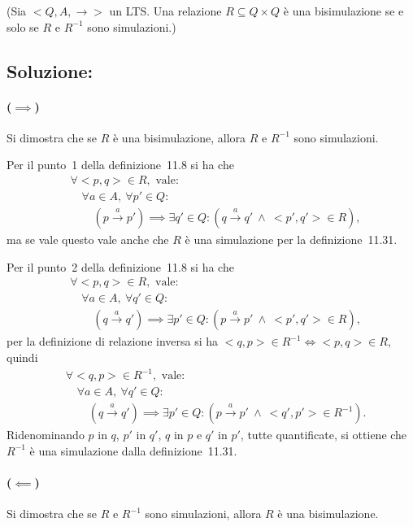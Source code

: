\documentclass[a4paper,twosides]{report}
\begin{document}
{\tiny
(Sia $<Q, A, \rightarrow >$ un LTS. Una relazione $R \subseteq Q \times Q$ è una bisimulazione se e solo se $R$ e $R^{-1}$
sono simulazioni.)
}
\subsection*{Soluzione:}
\paragraph{($\implies$)} Si dimostra che se $R$ \`e una
bisimulazione, allora $R$ e $R^{-1}$ sono simulazioni.

Per il punto~1 della
definizione~11.8 si ha che 
\begin{align*}
&\forall <p,q>\in R,\text{ vale:}\\
&\quad\forall a\in A,\ \forall p'\in Q:\\
&\quad\quad(p\xrightarrow{a} p')\implies\exists q'\in Q:(q\xrightarrow{a} q'\
\land\ <p',q'>\in R),
\end{align*}
ma se vale questo vale anche che $R$ \`e
una simulazione per la definizione~11.31.

Per il punto~2 della definizione~11.8 si ha che
\begin{align*}
&\forall <p,q>\in R,\text{ vale:}\\
&\quad\forall a\in A,\ \forall q'\in Q:\\
&\quad\quad(q\xrightarrow{a} q')\implies\exists p'\in Q:(p\xrightarrow{a} p'\
\land\ <p',q'>\in R),
\end{align*}
per la definizione di relazione inversa si ha
$<q,p>\in R^{-1}\iff<p,q>\in R$, quindi
\begin{align*}
&\forall <q,p>\in R^{-1},\text{ vale:}\\
&\quad\forall a\in A,\ \forall q'\in Q:\\
&\quad\quad(q\xrightarrow{a} q')\implies\exists p'\in Q:(p\xrightarrow{a} p'\
\land\ <q',p'>\in R^{-1}).
\end{align*}
Ridenominando $p$ in $q$, $p'$ in $q'$, $q$ in $p$ e $q'$ in $p'$,
tutte quantificate, si ottiene che $R^{-1}$ \`e una simulazione 
dalla definizione~11.31.

\paragraph{($\impliedby$)} Si dimostra che se $R$ e $R^{-1}$ sono
simulazioni, allora $R$ \`e una bisimulazione.
\end{document}
